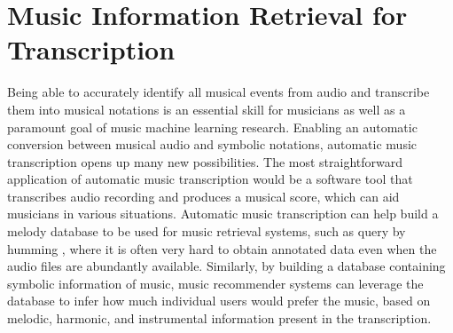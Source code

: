 
\graphicspath{{3-mir/figures/}}

\chapter{Music Information Retrieval for Transcription}
\label{ch:mir}

Being able to accurately identify all musical events from audio and transcribe them into musical notations is an essential skill for musicians as well as a paramount goal of music machine learning research.
Enabling an automatic conversion between musical audio and symbolic notations, automatic music transcription opens up many new possibilities.
The most straightforward application of automatic music transcription would be a software tool that transcribes audio recording and produces a musical score, which can aid musicians in various situations.
Automatic music transcription can help build a melody database to be used for music retrieval systems, such as query by humming \cite{molina2014humming}, where it is often very hard to obtain annotated data even when the audio files are abundantly available.
Similarly, by building a database containing symbolic information of music, music recommender systems can leverage the database to infer how much individual users would prefer the music, based on melodic, harmonic, and instrumental information present in the transcription.


